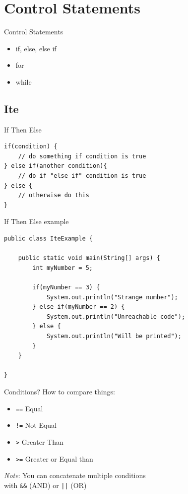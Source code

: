 \section{Control Statements}
\begin{frame}{Control Statements}
	
	\begin{itemize}
		\item if, else, else if
		\item for
		\item while
	\end{itemize}
		
\end{frame}



\subsection{Ite}
\begin{frame}[fragile]{{\huge I}f {\huge T}hen {\huge E}lse}
\begin{lstlisting}
if(condition) {
	// do something if condition is true
} else if(another condition){
	// do if "else if" condition is true 
} else {
	// otherwise do this
}
\end{lstlisting}
\end{frame}

\begin{frame}[fragile]{{\huge I}f {\huge T}hen {\huge E}lse example}
\begin{lstlisting}
public class IteExample {

	public static void main(String[] args) {
		int myNumber = 5;
		
		if(myNumber == 3) {
			System.out.println("Strange number");
		} else if(myNumber == 2) {
			System.out.println("Unreachable code");
		} else {
			System.out.println("Will be printed");
		}
	}
    
}
\end{lstlisting}
\end{frame}

\begin{frame}{Conditions?}
How to compare things:
\begin{itemize}
    \item \texttt{==} Equal
    \item \texttt{!=} Not Equal
    \item \texttt{>} Greater Than
    \item \texttt{>=} Greater or Equal than
\end{itemize}
\textit{Note}: You can concatenate multiple conditions\\ with \texttt{\&\&} (AND) or \texttt{||} (OR)
\end{frame}

